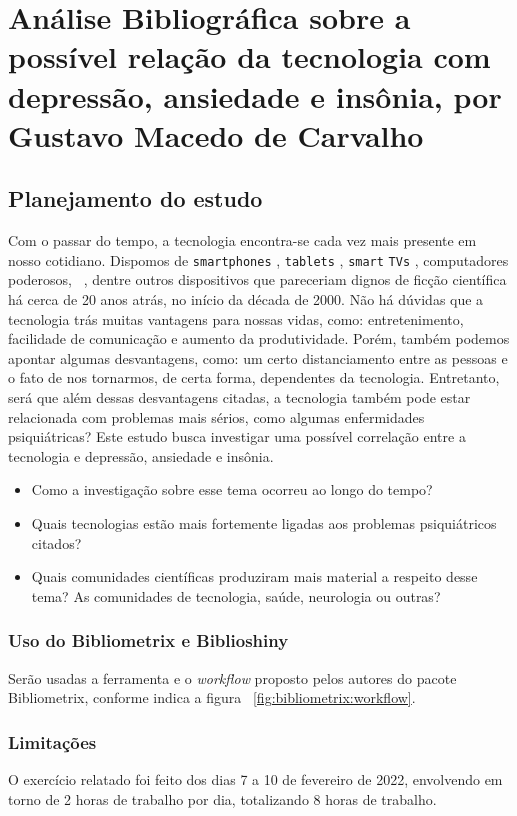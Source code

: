 \chapter{Análise Bibliográfica sobre a possível relação da tecnologia com depressão, ansiedade e insônia, por Gustavo Macedo de Carvalho\label{chap:bibliometria:GustavoMacCar}}

\section{Planejamento do estudo}
Com o passar do tempo, a tecnologia encontra-se cada vez mais presente em nosso cotidiano. Dispomos de \texttt{smartphones} , \texttt{tablets} , \texttt{smart} \texttt{TVs} , computadores poderosos, \smartwatches\ , dentre outros dispositivos que pareceriam
dignos de ficção científica há cerca de 20 anos atrás, no início da década de 2000. Não há dúvidas que a tecnologia trás muitas vantagens para nossas vidas, como: entretenimento, facilidade de comunicação e aumento da produtividade.
Porém, também podemos apontar algumas desvantagens, como: um certo distanciamento entre as pessoas e o fato de nos tornarmos, de certa forma, dependentes da tecnologia. Entretanto, será que além dessas desvantagens citadas, a tecnologia também
pode estar relacionada com problemas mais sérios, como algumas enfermidades psiquiátricas? Este estudo busca investigar uma possível correlação entre a tecnologia e depressão, ansiedade e insônia.
\begin{itemize}
    \item Como a investigação sobre esse tema ocorreu ao longo do tempo?
    \item Quais tecnologias estão mais fortemente ligadas aos problemas psiquiátricos citados?
    \item Quais comunidades científicas produziram mais material a respeito desse tema? As comunidades de tecnologia, saúde, neurologia ou outras?
\end{itemize}

\subsection{Uso do Bibliometrix e Biblioshiny}
Serão usadas a ferramenta e o \textit{workflow} proposto pelos autores do pacote Bibliometrix, conforme indica a figura ~\ref{fig:bibliometrix:workflow}.

\subsection{Limitações} O exercício relatado foi feito dos dias 7 a 10 de fevereiro de 2022, envolvendo em torno de 2 horas de trabalho por dia, totalizando 8 horas de trabalho.

